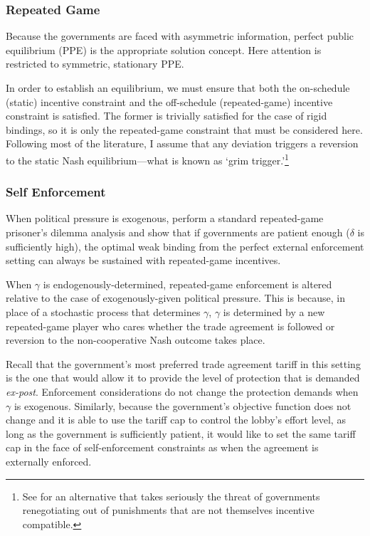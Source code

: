 \documentclass[12pt,titlepage]{article}
\newcommand{\ga}{\gamma}
\newcommand{\de}{\delta}
\begin{document}
\subsubsection{Repeated Game}
Because the governments are faced with asymmetric information, perfect public equilibrium (PPE) is the appropriate solution concept. Here attention is restricted to symmetric, stationary PPE.
	
In order to establish an equilibrium, we must ensure that both the on-schedule (static) incentive constraint and the off-schedule (repeated-game) incentive constraint is satisfied. The former is trivially satisfied for the case of rigid bindings, so it is only the repeated-game constraint that must be considered here. Following most of the literature, I assume that any deviation triggers a reversion to the static Nash equilibrium---what is known as `grim trigger.'\footnote{See \Textcite{krw} for an alternative that takes seriously the threat of governments renegotiating out of punishments that are not themselves incentive compatible.\label{fn:krw}}
	
\subsubsection{Self Enforcement}
\label{sec:selfweak}
When political pressure is exogenous, \Textcite{bs2005} perform a standard repeated-game prisoner's dilemma analysis and show that if governments are patient enough ($\de$ is sufficiently high), the optimal weak binding from the perfect external enforcement setting can always be sustained with repeated-game incentives.

When $\ga$ is endogenously-determined, repeated-game enforcement is altered relative to the case of exogenously-given political pressure. This is because, in place of a stochastic process that determines $\ga$, $\ga$ is determined by a new repeated-game player who cares whether the trade agreement is followed or reversion to the non-cooperative Nash outcome takes place.

Recall that the government's most preferred trade agreement tariff in this setting is the one that would allow it to provide the level of protection that is demanded \textit{ex-post}. Enforcement considerations do not change the protection demands when $\ga$ is exogenous. Similarly, because the government's objective function does not change and it is able to use the tariff cap to control the lobby's effort level, as long as the government is sufficiently patient, it would like to set the same tariff cap in the face of self-enforcement constraints as when the agreement is externally enforced.
\end{document}
